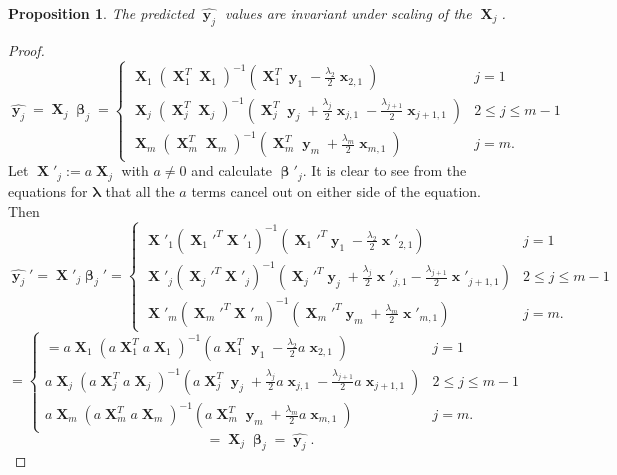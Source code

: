 \documentclass[12pt]{article}
\DeclareMathOperator{\bx}{\mathbf{x}}
\DeclareMathOperator{\bX}{\mathbf{X}}
\DeclareMathOperator{\by}{\mathbf{y}}
\DeclareMathOperator{\bbeta}{\boldsymbol{\beta}}
\newtheorem{prop}{Proposition}
\begin{document}
\begin{prop}
The predicted $\widehat{\by_j}$ values are invariant under scaling of the $\bX_j$.
\end{prop}
\begin{proof}
$$\widehat{\by_j} = \bX_j \bbeta_j=\begin{cases}
\bX_1(\bX_1^T  \bX_1)^{-1}(\bX_1^T \by_1 -\frac{\lambda_{2}}{2}\bx_{2, 1}) & j=1 \\
\bX_j(\bX_j^T  \bX_j)^{-1}(\bX_j^T \by_j + \frac{\lambda_j}{2}\bx_{j, 1}-\frac{\lambda_{j+1}}{2}\bx_{j+1, 1}) & 2 \leq j \leq m-1 \\
\bX_m(\bX_m^T \bX_m)^{-1}(\bX_m^T \by_m + \frac{\lambda_m}{2}\bx_{m, 1}) & j=m.
\end{cases}$$
Let $\bX'_j := a\bX_j$ with $a \neq 0$ and calculate $\bbeta'_j$. It is clear to see from the equations for $\boldsymbol{\lambda}$ that all the $a$ terms cancel out on either side of the equation. Then 
$$\widehat{\by_j}' = \bX'_j \bbeta_j'=\begin{cases}
\bX'_1(\bX_1'^T  \bX'_1)^{-1}(\bX_1'^T \by_1 -\frac{\lambda_{2}}{2}\bx'_{2, 1}) & j=1 \\
\bX'_j(\bX_j'^T  \bX'_j)^{-1}(\bX_j'^T \by_j + \frac{\lambda_j}{2}\bx'_{j, 1}-\frac{\lambda_{j+1}}{2}\bx'_{j+1, 1}) & 2 \leq j \leq m-1 \\
\bX'_m(\bX_m'^T \bX'_m)^{-1}(\bX_m'^T \by_m + \frac{\lambda_m}{2}\bx'_{m, 1}) & j=m.
\end{cases}$$
$$=\begin{cases}
=a\bX_1(a\bX_1^T  a\bX_1)^{-1}(a\bX_1^T \by_1 -\frac{\lambda_{2}}{2}a\bx_{2, 1}) & j=1 \\
a\bX_j(a\bX_j^T  a\bX_j)^{-1}(a\bX_j^T \by_j + \frac{\lambda_j}{2}a\bx_{j, 1}-\frac{\lambda_{j+1}}{2}a\bx_{j+1, 1}) & 2 \leq j \leq m-1 \\
a\bX_m(a\bX_m^T a\bX_m)^{-1}(a\bX_m^T \by_m + \frac{\lambda_m}{2}a\bx_{m, 1}) & j=m.
\end{cases}$$
$$=\bX_j \bbeta_j = \widehat{\by_j}.$$
\end{proof}
\end{document}
